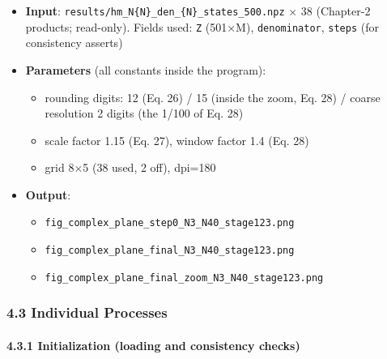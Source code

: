 \documentclass[
  a4paper,
]{ltjsarticle}
\providecommand{\tightlist}{%
  \setlength{\itemsep}{0pt}\setlength{\parskip}{0pt}}
\begin{document}
\begin{itemize}
\tightlist
\item
  \textbf{Input}:
  \texttt{results/hm\_N\{N\}\_den\_\{N\}\_states\_500.npz} × 38
  (Chapter-2 products; read-only). Fields used: \texttt{Z} (501×M),
  \texttt{denominator}, \texttt{steps} (for consistency asserts)
\item
  \textbf{Parameters} (all constants inside the program):

  \begin{itemize}
  \tightlist
  \item
    rounding digits: 12 (Eq. 26) / 15 (inside the zoom, Eq. 28) / coarse
    resolution 2 digits (the 1/100 of Eq. 28)
  \item
    scale factor 1.15 (Eq. 27), window factor 1.4 (Eq. 28)
  \item
    grid 8×5 (38 used, 2 off), dpi=180
  \end{itemize}
\item
  \textbf{Output}:

  \begin{itemize}
  \tightlist
  \item
    \texttt{fig\_complex\_plane\_step0\_N3\_N40\_stage123.png}
  \item
    \texttt{fig\_complex\_plane\_final\_N3\_N40\_stage123.png}
  \item
    \texttt{fig\_complex\_plane\_final\_zoom\_N3\_N40\_stage123.png}
  \end{itemize}
\end{itemize}

\subsubsection{4.3 Individual Processes}\label{individual-processes}

\paragraph{4.3.1 Initialization (loading and consistency
checks)}\label{initialization-loading-and-consistency-checks}
\end{document}
